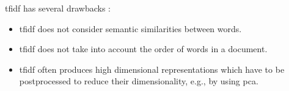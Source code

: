\ac{tfidf} has several drawbacks \cite{clusteringDocs2020,tfidf2008}:
\begin{itemize}
    \item \ac{tfidf} does not consider semantic similarities between words.
    \item \ac{tfidf} does not take into account the order of words in a document.
    \item \ac{tfidf} often produces high dimensional representations which have to be postprocessed to reduce their dimensionality, e.g., by using \ac{pca}.
\end{itemize}

